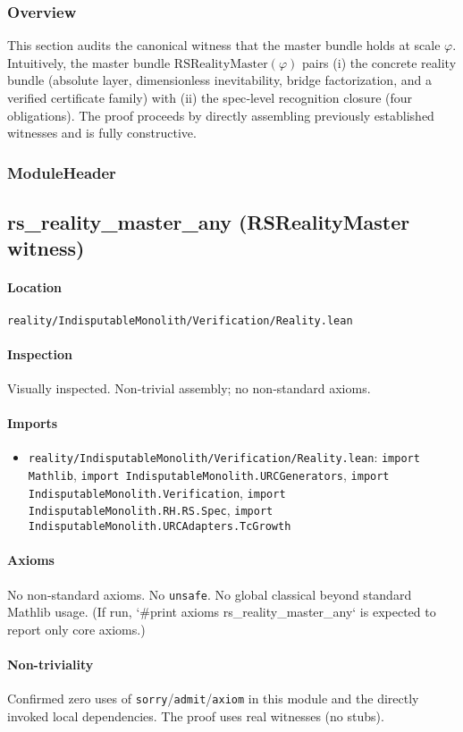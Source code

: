 \documentclass{article}
\newcommand{\FileRef}[1]{\texttt{#1}}
\newcommand{\ModuleHeader}[3]{%
  \subsection{#1}
  \paragraph{Location} \FileRef{#2}\\
  \paragraph{Inspection} #3
}
\begin{document}
\subsubsection{Overview}
This section audits the canonical witness that the master bundle holds at scale \(\varphi\). Intuitively, the master bundle \(\mathrm{RSRealityMaster}(\varphi)\) pairs (i) the concrete reality bundle (absolute layer, dimensionless inevitability, bridge factorization, and a verified certificate family) with (ii) the spec‑level recognition closure (four obligations). The proof proceeds by directly assembling previously established witnesses and is fully constructive.

\subsubsection{ModuleHeader}
\ModuleHeader{rs\_reality\_master\_any (RSRealityMaster witness)}{reality/IndisputableMonolith/Verification/Reality.lean}{Visually inspected. Non‑trivial assembly; no non‑standard axioms.}

\paragraph{Imports}
\begin{itemize}[leftmargin=*]
  \item \FileRef{reality/IndisputableMonolith/Verification/Reality.lean}: \texttt{import Mathlib}, \texttt{import IndisputableMonolith.URCGenerators}, \texttt{import IndisputableMonolith.Verification}, \texttt{import IndisputableMonolith.RH.RS.Spec}, \texttt{import IndisputableMonolith.URCAdapters.TcGrowth}
\end{itemize}

\paragraph{Axioms}
No non‑standard axioms. No \texttt{unsafe}. No global classical beyond standard Mathlib usage. (If run, `#print axioms rs_reality_master_any` is expected to report only core axioms.)

\paragraph{Non-triviality}
Confirmed zero uses of \texttt{sorry}/\texttt{admit}/\texttt{axiom} in this module and the directly invoked local dependencies. The proof uses real witnesses (no stubs).
\end{document}
